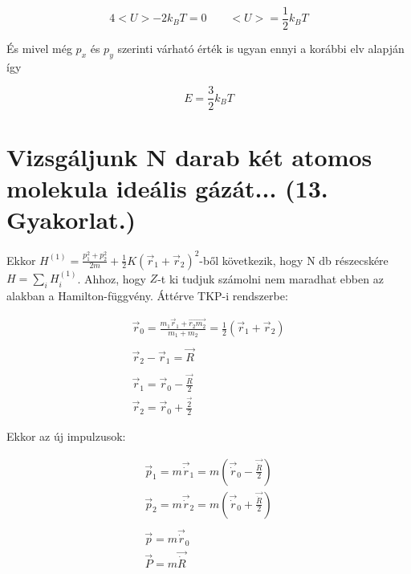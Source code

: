 \documentclass[a4paper,12pt]{article}
\begin{document}
\begin{equation}
4<U> - 2k_{B}T = 0 \quad \quad <U> = \frac{1}{2}k_{B}T
\end{equation}

\par És mivel még $p_{x}$ és $p_{y}$ szerinti várható érték is ugyan ennyi a korábbi elv alapján így

\begin{equation}
E = \frac{3}{2}k_{B}T
\end{equation}

\section{Vizsgáljunk N darab két atomos molekula ideális gázát... (13. Gyakorlat.)}

\par Ekkor $H^{(1)} = \frac{p^{2}_{1}+p_{2}^{2}}{2m} + \frac{1}{2}K(\vec{r}_{1} + \vec{r}_{2})^{2}$-ből következik, hogy N db részecskére $H = \sum_{i}H^{(1)}_{i}$. Ahhoz, hogy $Z$-t ki tudjuk számolni nem maradhat ebben az alakban a Hamilton-függvény. Áttérve TKP-i rendszerbe:

\begin{equation*}
\begin{gathered}
\vec{r}_{0} = \frac{m_{1}\vec{r}_{1}+\vec{r_{2}m_{2}}}{m_{1}+m_{2}} = \frac{1}{2}(\vec{r}_{1} + \vec{r}_{2}) \\ \\
\vec{r}_{2} - \vec{r}_{1} = \vec{R} \\ \\
\vec{r}_{1} = \vec{r}_{0} - \frac{\vec{R}}{2} \\
\vec{r}_{2} = \vec{r}_{0} + \frac{\vec{2}}{2}
\end{gathered}
\end{equation*}

\par Ekkor az új impulzusok:

\begin{equation*}
\begin{gathered}
\vec{p}_{1} = m\vec{\dot{r}}_{1} = m(\vec{\dot{r}}_{0} - \frac{\vec{\dot{R}}}{2}) \\
\vec{p}_{2} = m\vec{\dot{r}}_{2} = m(\vec{\dot{r}}_{0} + \frac{\vec{\dot{R}}}{2}) \\ \\
\vec{p} = m\vec{\dot{r}}_{0} \\
\vec{P} = m\vec{\dot{R}}
\end{gathered}
\end{equation*}
\end{document}
